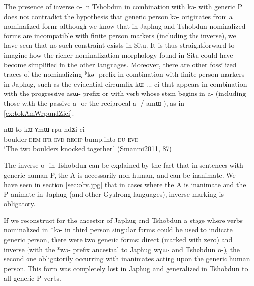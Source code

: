 \documentclass[oldfontcommands,oneside,a4paper,11pt]{article}
\newcommand{\ipa}[1]{{\phon \mbox{#1}}} %
\begin{document}
 The presence of inverse \ipa{o-} in Tshobdun in combination with \ipa{kə-} with generic P does not contradict the hypothesis that generic person \ipa{kə-} originates from a nominalized form: although we know that in Japhug and Tshobdun nominalized forms are incompatible with finite person markers (including the inverse), we have seen that no such constraint exists in Situ. It is thus straightforward to imagine how the richer nominalization morphology found in Situ could have become simplified in the other languages. Moreover, there are other fossilized traces of the nominalizing *\ipa{kə-} prefix in combination with finite person markers in Japhug, such as the evidential circumfix \ipa{kɯ-}...\ipa{-ci} that appears in combination with the progressive \ipa{asɯ-} prefix or with verb whose stem begins in \ipa{a-} (including those with the passive \ipa{a-} or the reciprocal \ipa{a-} / \ipa{amɯ-}), as in \ref{ex:tokAmWrpundZici}. 


\begin{exe}
\ex \label{ex:tokAmWrpundZici}
\gll \ipa{rŋgɯ}  	\ipa{nɯ}  	\ipa{to-kɯ-ɤmɯ-rpu-ndʑi-ci}  \\
boulder \textsc{dem} \textsc{ifr}-\textsc{evd}-\textsc{recip}-bump.into-\textsc{du}-\textsc{evd} \\
\glt `The two boulders knocked together.' (Smanmi2011, 87)
\end{exe}


The inverse  \ipa{o-} in Tshobdun can be explained by  the fact that in sentences with generic human P, the A is necessarily non-human, and can be inanimate. We have seen in section \ref{sec:obv.jpg} that in cases where the A is inanimate and the P animate in Japhug (and other Gyalrong languages), inverse marking is obligatory. 


If we reconstruct for the ancestor of Japhug and Tshobdun a stage where verbs nominalized in *\ipa{kə-} in third person singular forms could be used to indicate generic person, there were two generic forms: direct (marked with zero) and inverse (with the *\ipa{wə-} prefix ancestral to Japhug \ipa{wɣɯ-} and Tshobdun \ipa{o-}), the second one obligatorily occurring with inanimates acting upon the generic human person. This form was completely lost in Japhug and generalized in Tshobdun to all generic P verbs.
\end{document}
